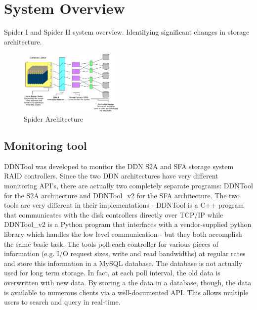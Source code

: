 \section{System Overview}
\label{sec:overview}

Spider I and Spider II system overview. Identifying significant changes in storage architecture.

\begin{figure}[!t]
\centering
\includegraphics[width=0.45\textwidth]{./figs/spider2arch.ps}
\vspace{-0.1in}
\centering
\caption{Spider Architecture}
\label{fig:arch}
\end{figure}

\subsection{Monitoring tool}
DDNTool \cite{ddntool10:ross} was developed to monitor the DDN S2A and SFA storage system RAID controllers. Since the two DDN architectures have very different monitoring API's, there are actually two completely separate programs:  DDNTool for the S2A architecture and DDNTool\_v2 for the SFA architecture.  The two tools are very different in their implementations - DDNTool is a C++ program that communicates with the disk controllers directly over TCP/IP while DDNTool\_v2 is a Python program that interfaces with a vendor-supplied python library which handles the low level communication - but they both accomplish the same basic task.  The tools poll each controller for various pieces of information (e.g. I/O request sizes, write and read bandwidths) at regular rates and store this information in a MySQL database.  The database is not actually used for long term storage.  In fact, at each poll interval, the old data is overwritten with new data.  By storing a the data in a database, though, the data is available to numerous clients via a well-documented API.  This allows multiple users to search and query in real-time.

